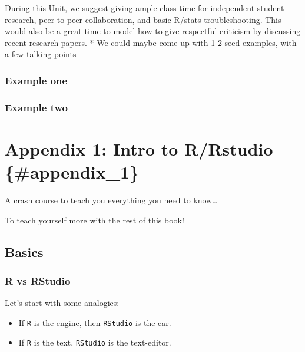 \documentclass[
]{book}
\begin{document}
During this Unit, we suggest giving ample class time for independent student research, peer-to-peer collaboration, and basic R/stats troubleshooting. This would also be a great time to model how to give respectful criticism by discussing recent research papers.
* We could maybe come up with 1-2 seed examples, with a few talking points

\hypertarget{example-one}{%
\subsection{Example one}\label{example-one}}

\hypertarget{example-two}{%
\subsection{Example two}\label{example-two}}

\hypertarget{appendix-1-intro-to-rrstudio-appendix_1}{%
\chapter*{Appendix 1: Intro to R/Rstudio \{\#appendix\_1\}}\label{appendix-1-intro-to-rrstudio-appendix_1}}

A crash course to teach you everything you need to know\ldots{}

To teach yourself more with the rest of this book!

\hypertarget{basics}{%
\section*{Basics}\label{basics}}

\hypertarget{r-vs-rstudio}{%
\subsection*{R vs RStudio}\label{r-vs-rstudio}}

Let's start with some analogies:

\begin{itemize}
\item
  If \texttt{R} is the engine, then \texttt{RStudio} is the car.
\item
  If \texttt{R} is the text, \texttt{RStudio} is the text-editor.
\end{itemize}
\end{document}
